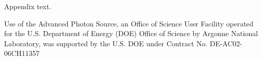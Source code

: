 \documentclass[pdf]{iucr}              %
\begin{document}
Appendix text.



Use of the Advanced Photon Source, an Office of Science User Facility operated for the U.S. Department of Energy (DOE) Office of Science by Argonne National Laboratory, was supported by the U.S. DOE under Contract No. DE-AC02-06CH11357





 
\end{document}
